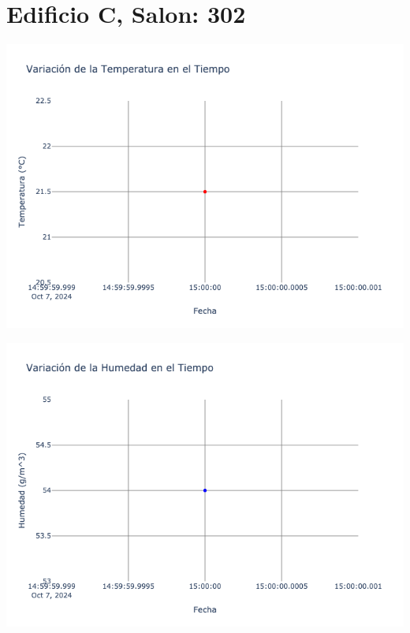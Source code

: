 \documentclass{article}
\begin{document}
    \section{Edificio C, Salon: 302}
    \noindent
    \begin{minipage}{0.48\textwidth}
        \centering
        \includegraphics[width=\textwidth]{../img/poli/TS302-90Dias-03-12-2024.png}
    \end{minipage}
    \hfill
    \begin{minipage}{0.48\textwidth}
        \centering
        \includegraphics[width=\textwidth]{../img/poli/HS302-90Dias-03-12-2024.png}
    \end{minipage}
\end{document}
